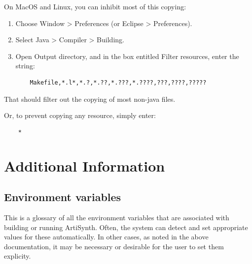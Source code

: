 \documentclass{article}
\begin{document}
On MacOS and Linux, you can inhibit most of this copying:

\begin{enumerate}

\item Choose {\sf Window > Preferences} (or {\sf Eclipse > Preferences}).

\item Select {\sf Java > Compiler > Building}.

\item Open {\sf Output directory}, and in the box entitled {\sf Filter resources},
  enter the string:

\begin{lstlisting}
    Makefile,*.l*,*.?,*.??,*.???,*.????,???,????,?????
\end{lstlisting}

\end{enumerate}

That should filter out the copying of most non-java files.

Or, to prevent copying any resource, simply enter: 
\begin{lstlisting}
    *
\end{lstlisting}

\section{Additional Information}

\subsection{Environment variables}
\label{EnvironmentVariables}

This is a glossary of all the environment variables that are
associated with building or running ArtiSynth. Often, the system can
detect and set appropriate values for these automatically. In other
cases, as noted in the above documentation, it may be necessary or
desirable for the user to set them explicity.
\end{document}

